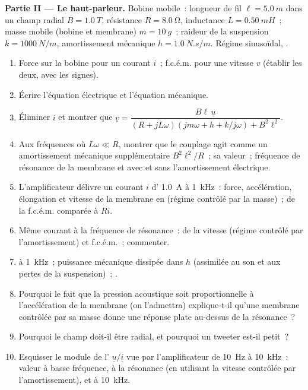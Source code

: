 \begin{problem}
\medskip
\noindent\textbf{Partie II --- Le haut-parleur.}
Bobine mobile~: longueur de fil $\ell = \qty{5.0}{m}$ dans un champ radial $B =
\qty{1.0}{T}$, résistance $R = \qty{8.0}{\ohm}$, inductance $L = \qty{0.50}{mH}$~;
masse mobile (bobine et membrane) $m = \qty{10}{g}$~; raideur de la suspension
$k = \qty{1000}{N/m}$, amortissement mécanique $h = \qty{1.0}{N.s/m}$. Régime
sinusoïdal, .
\begin{enumerate}[resume]
  \item Force sur la bobine pour un courant $i$~; f.c.é.m. pour une vitesse $v$
        (établir les deux, avec les signes).
  \item Écrire l'équation électrique et l'équation mécanique.
  \item Éliminer $i$ et montrer que
        $\underline v = \dfrac{B\ell\,\underline u}{(R + jL\omega)(jm\omega + h + k/j\omega) + B^2\ell^2}$.
  \item Aux fréquences où $L\omega \ll R$, montrer que le couplage agit comme
        un amortissement mécanique supplémentaire $B^2\ell^2/R$~; sa valeur~;
        fréquence de résonance de la membrane et  avec et
        sans l'amortissement électrique.
  \item L'amplificateur délivre un courant $i$ d' \qty{1.0}{A} à \qty{1}{kHz}~:
        force, accélération, élongation et vitesse de la membrane en
         (régime contrôlé par la masse)~;  de la f.c.é.m.
        comparée à $Ri$.
  \item Même courant à la fréquence de résonance~:  de la vitesse
        (régime contrôlé par l'amortissement) et f.c.é.m.~; commenter.
  \item {} à \qty{1}{kHz}~; puissance mécanique dissipée dans
        $h$ (assimilée au son et aux pertes de la suspension)~; .
  \item Pourquoi le fait que la pression acoustique soit proportionnelle à
        l'accélération de la membrane (on l'admettra) explique-t-il qu'une
        membrane contrôlée par sa masse donne une réponse plate au-dessus de
        la résonance~?
  \item Pourquoi le champ doit-il être radial, et pourquoi un tweeter est-il petit~?
  \item Esquisser le module de l' $\underline u/\underline i$ vue par
        l'amplificateur de \qty{10}{Hz} à \qty{10}{kHz}~: valeur à basse
        fréquence, à la résonance (en utilisant la vitesse contrôlée par
        l'amortissement), et à \qty{10}{kHz}.
\end{enumerate}


\end{problem}
